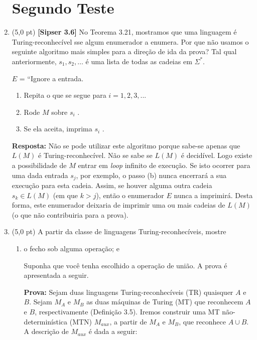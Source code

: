 \documentclass[12pt,a4paper,oneside]{article}
\begin{document}
\begin{enumerate}
	
	\section*{Segundo Teste}
	
	\item (5,0 pt)  {\bf [Sipser 3.6]} No Teorema 3.21, mostramos que uma linguagem é Turing-reconhecível sse algum enumerador a enumera. Por que não usamos o seguinte algoritmo mais simples
	para a direção de ida da prova? Tal qual anteriormente, $s_1, s_2, \ldots$ é uma lista de todas as cadeias em $\Sigma^*$.
	
	$E$ = ``Ignore a entrada.
	
	\begin{enumerate}
		\item Repita o que se segue para $i = 1,2,3,...$
		\item Rode $M$ sobre $s_i$ .
		\item Se ela aceita, imprima $s_i$ .
	\end{enumerate}

	\vspace{0.3cm}
	
	{\color{blue} {\bf Resposta:} Não se pode utilizar este algoritmo porque sabe-se apenas que $L(M)$ é Turing-reconhecível. Não se sabe se $L(M)$ é decidível. Logo existe a possibilidade de $M$ entrar em {\it loop} infinito de execução. Se isto ocorrer para uma dada entrada $s_j$, por exemplo, o passo (b) nunca encerrará a sua execução para esta cadeia. Assim, se houver alguma outra cadeia $s_k \in L(M)$ (em que $k > j$), então o enumerador $E$ nunca a imprimirá. Desta forma, este enumerador deixaria de imprimir uma ou mais cadeias de $L(M)$ (o que não contribuiria para a prova).
	
	}

	\newpage
	
	\item (5,0 pt) A partir da classe de linguagens Turing-reconhecíveis, mostre 
	\begin{enumerate}
		\item o fecho sob alguma operação; e
		
		\vspace{0.3cm}
		
		{\color{blue} Suponha que você tenha escolhido a operação de união. A prova é apresentada a seguir.
			
			{\bf Prova:} Sejam duas linguagens Turing-reconhecíveis (TR) quaisquer $A$ e $B$. Sejam $M_A$ e $M_B$ as duas máquinas de Turing (MT) que reconhecem $A$ e $B$, respectivamente (Definição 3.5). Iremos construir uma MT não-determinística (MTN) $M_{aux}$, a partir de $M_A$ e $M_B$, que reconhece $A \cup B$. A descrição de $M_{aux}$ é dada a seguir: 
			
}
\end{enumerate}
\end{enumerate}
\end{document}
